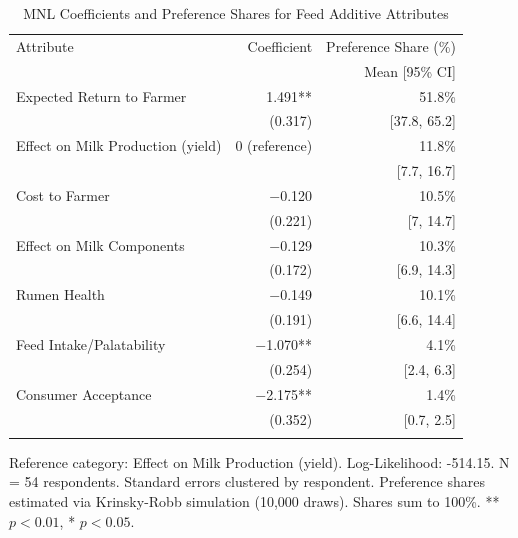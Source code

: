 \begin{table}[H]
\centering
\caption{MNL Coefficients and Preference Shares for Feed Additive Attributes}
\label{tab:bw_combined}
\vspace{-8pt}
\begin{threeparttable}
\begin{tabular}{lrr}
\toprule
Attribute & Coefficient & Preference Share (\%) \\
 & & Mean [95\% CI] \\
\midrule
Expected Return to Farmer & 1.491** & 51.8\% \\
 & (0.317) & [37.8, 65.2] \\
\addlinespace[2pt]
Effect on Milk Production (yield) & 0 (reference) & 11.8\% \\
 &  & [7.7, 16.7] \\
\addlinespace[2pt]
Cost to Farmer & $-$0.120 & 10.5\% \\
 & (0.221) & [7, 14.7] \\
\addlinespace[2pt]
Effect on Milk Components & $-$0.129 & 10.3\% \\
 & (0.172) & [6.9, 14.3] \\
\addlinespace[2pt]
Rumen Health & $-$0.149 & 10.1\% \\
 & (0.191) & [6.6, 14.4] \\
\addlinespace[2pt]
Feed Intake/Palatability & $-$1.070** & 4.1\% \\
 & (0.254) & [2.4, 6.3] \\
\addlinespace[2pt]
Consumer Acceptance & $-$2.175** & 1.4\% \\
 & (0.352) & [0.7, 2.5] \\
\addlinespace[2pt]
\bottomrule
\end{tabular}
\begin{tablenotes}[flushleft]\footnotesize
\item Reference category: Effect on Milk Production (yield). Log-Likelihood: -514.15. N = 54 respondents. Standard errors clustered by respondent. Preference shares estimated via Krinsky-Robb simulation (10{,}000 draws). Shares sum to 100\%. ** $p < 0.01$, * $p < 0.05$.
\end{tablenotes}
\end{threeparttable}
\end{table}
